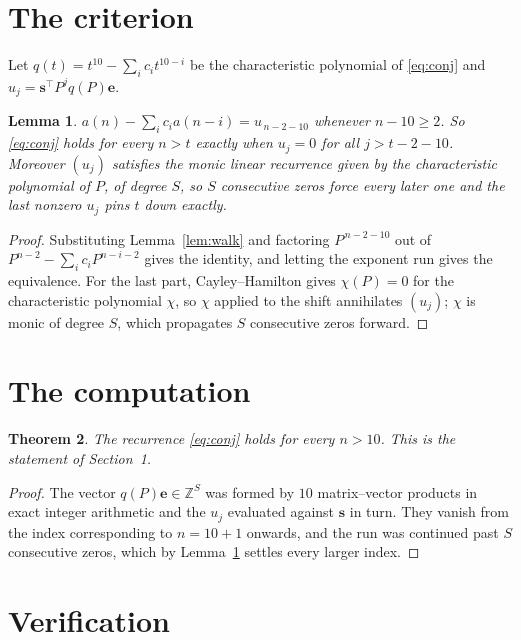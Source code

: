 \documentclass[11pt,a4paper]{article}
\theoremstyle{plain}
\newtheorem{theorem}{Theorem}
\newtheorem{lemma}[theorem]{Lemma}
\theoremstyle{definition}
\begin{document}
\section{The criterion}

Let $q(t)=t^{10}-\sum_i c_i t^{10-i}$ be the characteristic polynomial of
\eqref{eq:conj} and $u_j=\mathbf{s}^{\!\top}P^{j}q(P)\mathbf{e}$.

\begin{lemma}\label{lem:crit}
$a(n)-\sum_i c_i a(n-i)=u_{\,n-2-10}$ whenever $n-10\ge2$. So \eqref{eq:conj}
holds for every $n>t$ exactly when $u_j=0$ for all $j>t-2-10$. Moreover $(u_j)$
satisfies the monic linear recurrence given by the characteristic polynomial of $P$, of
degree $S$, so $S$ consecutive zeros force every later one and the last nonzero $u_j$ pins
$t$ down exactly.
\end{lemma}

\begin{proof}
Substituting Lemma~\ref{lem:walk} and factoring $P^{\,n-2-10}$ out of
$P^{n-2}-\sum_i c_i P^{n-i-2}$ gives the identity, and letting the exponent run gives the
equivalence. For the last part, Cayley--Hamilton gives $\chi(P)=0$ for the characteristic
polynomial $\chi$, so $\chi$ applied to the shift annihilates $(u_j)$; $\chi$ is monic of
degree $S$, which propagates $S$ consecutive zeros forward.
\end{proof}

\section{The computation}

\begin{theorem}
The recurrence \eqref{eq:conj} holds for every $n>10$. This is the statement of
Section~1.
\end{theorem}

\begin{proof}
The vector $q(P)\mathbf{e}\in\mathbb{Z}^{S}$ was formed by $10$ matrix--vector
products in exact integer arithmetic and the $u_j$ evaluated against $\mathbf{s}$ in turn.
They vanish from the index corresponding to $n=10+1$ onwards, and the run was continued
past $S$ consecutive zeros, which by Lemma~\ref{lem:crit} settles every larger index.
\end{proof}

\section{Verification}
\end{document}
